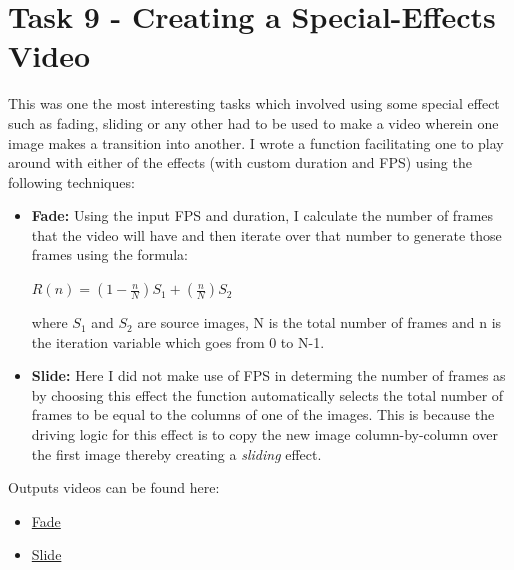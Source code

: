\documentclass[notitlepage]{report}
\begin{document}
\section{Task 9 - Creating a Special-Effects Video}
This was one the most interesting tasks which involved using some special effect such as fading, sliding or any other had to be used to make a video wherein one image
makes a transition into another. I wrote a function facilitating one to play around with either of the effects (with custom duration and FPS) using the following techniques:
\begin{itemize}
    \item \textbf{Fade:} Using the input FPS and duration, I calculate the number of frames that the video will have and then iterate over that number to generate those frames
    using the formula:
    \begin{center}
        $R(n) = (1-\frac{n}{N})S_1 + (\frac{n}{N})S_2$
    \end{center}
    where $S_1$ and $S_2$ are source images, N is the total number of frames and n is the iteration variable which goes from 0 to N-1.
    \item \textbf{Slide:} Here I did not make use of FPS in determing the number of frames as by choosing this effect the function automatically selects the 
    total number of frames to be equal to the columns of one of the images. This is because the driving logic for this effect is to copy the new image column-by-column
    over the first image thereby creating a \textit{sliding} effect. 
\end{itemize}

Outputs videos can be found here:
\begin{itemize}
    \item \href{https://iiitaphyd-my.sharepoint.com/:v:/g/personal/soham_vaishnav_research_iiit_ac_in/ETZDCFDibwJPpaSgd_yHo3EBmKhZDK9ihggEEYdAYTPnCA?nav=eyJyZWZlcnJhbEluZm8iOnsicmVmZXJyYWxBcHAiOiJPbmVEcml2ZUZvckJ1c2luZXNzIiwicmVmZXJyYWxBcHBQbGF0Zm9ybSI6IldlYiIsInJlZmVycmFsTW9kZSI6InZpZXciLCJyZWZlcnJhbFZpZXciOiJNeUZpbGVzTGlua0NvcHkifX0&e=viOq7r}{Fade}
    \item \href{https://iiitaphyd-my.sharepoint.com/:v:/g/personal/soham_vaishnav_research_iiit_ac_in/EZKr7tYxMEpDqLKFYQYEAkIB3AHYE3ZuQwMCcb82G2IdiQ?nav=eyJyZWZlcnJhbEluZm8iOnsicmVmZXJyYWxBcHAiOiJPbmVEcml2ZUZvckJ1c2luZXNzIiwicmVmZXJyYWxBcHBQbGF0Zm9ybSI6IldlYiIsInJlZmVycmFsTW9kZSI6InZpZXciLCJyZWZlcnJhbFZpZXciOiJNeUZpbGVzTGlua0NvcHkifX0&e=yLP1Lg}{Slide}
\end{itemize}
\end{document}

